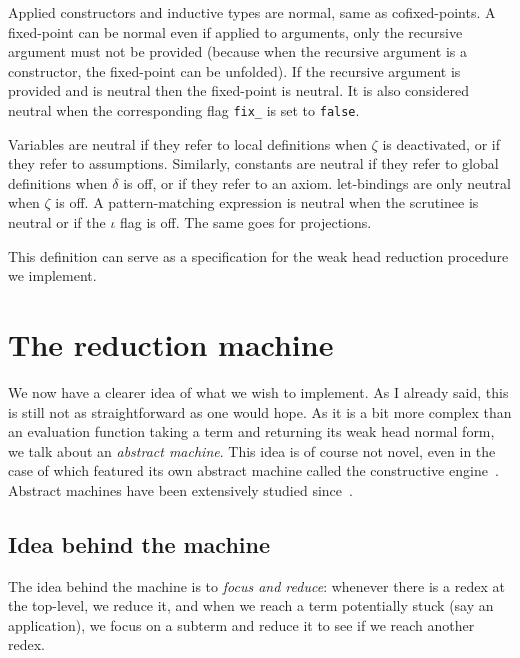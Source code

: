 Applied constructors and inductive types are normal, same as cofixed-points.
A fixed-point can be normal even if applied to arguments, only the recursive
argument must not be provided (because when the recursive argument is a
constructor, the fixed-point can be unfolded).
If the recursive argument is provided and is neutral then the fixed-point is
neutral.
It is also considered neutral when the corresponding flag \texttt{fix_}
is set to \texttt{false}.

Variables are neutral if they refer to local definitions when \(\zeta\) is
deactivated, or if they refer to assumptions.
Similarly, constants are neutral if they refer to global definitions when
\(\delta\) is off, or if they refer to an axiom.
let-bindings are only neutral when \(\zeta\) is off.
A pattern-matching expression is neutral when the scrutinee is neutral or if the
\(\iota\) flag is off. The same goes for projections.

This definition can serve as a specification for the weak head reduction
procedure we implement.

\section{The reduction machine}

We now have a clearer idea of what we wish to implement. As I already said, this
is still not as straightforward as one would hope.
As it is a bit more complex than an evaluation function taking a term and
returning its weak head normal form, we talk about an \emph{abstract machine}.
This idea is of course not novel, even in the case of \Coq which featured its
own abstract machine called the constructive
engine~. Abstract machines have been extensively
studied
since~.

\subsection{Idea behind the machine}

The idea behind the machine is to \emph{focus and reduce}: whenever there is
a redex at the top-level, we reduce it, and when we reach a term potentially
stuck (say an application), we focus on a subterm and reduce it to see if we
reach another redex.

